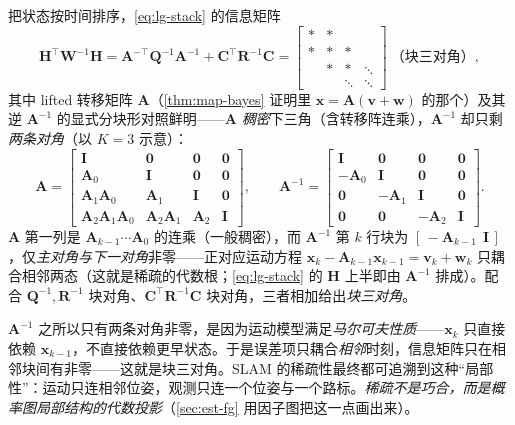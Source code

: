 把状态按时间排序，\cref{eq:lg-stack} 的信息矩阵
\begin{equation}
  \mathbf{H}^\top\mathbf{W}^{-1}\mathbf{H}=\mathbf{A}^{-\top}\mathbf{Q}^{-1}\mathbf{A}^{-1}+\mathbf{C}^\top\mathbf{R}^{-1}\mathbf{C}
  =\begin{bmatrix}*&*&&\\ *&*&*&\\ &*&*&\ddots\\ &&\ddots&\ddots\end{bmatrix}\ \text{（块三对角）},
  \label{eq:tridiag}
\end{equation}
其中 lifted 转移矩阵 $\mathbf{A}$（\cref{thm:map-bayes} 证明里 $\mathbf{x}=\mathbf{A}(\mathbf{v}+\mathbf{w})$ 的那个）及其逆 $\mathbf{A}^{-1}$ 的显式分块形对照鲜明——$\mathbf{A}$ \emph{稠密}下三角（含转移阵连乘），$\mathbf{A}^{-1}$ 却只剩\emph{两条对角}（以 $K=3$ 示意）：
\begin{equation}
  \mathbf{A}=\begin{bmatrix}
    \mathbf{I}&\mathbf{0}&\mathbf{0}&\mathbf{0}\\
    \mathbf{A}_0&\mathbf{I}&\mathbf{0}&\mathbf{0}\\
    \mathbf{A}_1\mathbf{A}_0&\mathbf{A}_1&\mathbf{I}&\mathbf{0}\\
    \mathbf{A}_2\mathbf{A}_1\mathbf{A}_0&\mathbf{A}_2\mathbf{A}_1&\mathbf{A}_2&\mathbf{I}
  \end{bmatrix},\qquad
  \mathbf{A}^{-1}=\begin{bmatrix}
    \mathbf{I}&\mathbf{0}&\mathbf{0}&\mathbf{0}\\
    -\mathbf{A}_0&\mathbf{I}&\mathbf{0}&\mathbf{0}\\
    \mathbf{0}&-\mathbf{A}_1&\mathbf{I}&\mathbf{0}\\
    \mathbf{0}&\mathbf{0}&-\mathbf{A}_2&\mathbf{I}
  \end{bmatrix}.
  \label{eq:lifted-Ainv}
\end{equation}
$\mathbf{A}$ 第一列是 $\mathbf{A}_{k-1}\!\cdots\!\mathbf{A}_0$ 的连乘（一般稠密），而 $\mathbf{A}^{-1}$ 第 $k$ 行块为 $[\,-\mathbf{A}_{k-1}\ \ \mathbf{I}\,]$，仅\emph{主对角与下一对角}非零——正对应运动方程 $\mathbf{x}_k-\mathbf{A}_{k-1}\mathbf{x}_{k-1}=\mathbf{v}_k+\mathbf{w}_k$ 只耦合相邻两态（这就是稀疏的代数根；\cref{eq:lg-stack} 的 $\mathbf{H}$ 上半即由 $\mathbf{A}^{-1}$ 排成）。配合 $\mathbf{Q}^{-1},\mathbf{R}^{-1}$ 块对角、$\mathbf{C}^\top\mathbf{R}^{-1}\mathbf{C}$ 块对角，三者相加给出\emph{块三对角}。

\begin{insight}
$\mathbf{A}^{-1}$ 之所以只有两条对角非零，是因为运动模型满足\emph{马尔可夫性质}——$\mathbf{x}_k$ 只直接依赖 $\mathbf{x}_{k-1}$，不直接依赖更早状态。于是误差项只耦合\emph{相邻}时刻，信息矩阵只在相邻块间有非零——这就是块三对角。SLAM 的稀疏性最终都可追溯到这种“局部性”：运动只连相邻位姿，观测只连一个位姿与一个路标。\emph{稀疏不是巧合，而是概率图局部结构的代数投影}（\cref{sec:est-fg} 用因子图把这一点画出来）。
\end{insight}


